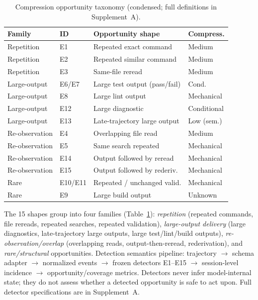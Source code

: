 ﻿\documentclass[sigconf,balance=false]{acmart}
\begin{document}
\begin{table}[t]
\centering
\caption{Compression opportunity taxonomy (condensed; full definitions in Supplement~A).}
\label{tab:taxonomy}
\small
\begin{tabular}{@{}llll@{}}
\toprule
\textbf{Family} & \textbf{ID} & \textbf{Opportunity shape} & \textbf{Compress.} \\
\midrule
Repetition & E1 & Repeated exact command & Medium \\
Repetition & E2 & Repeated similar command & Medium \\
Repetition & E3 & Same-file reread & Medium \\
Large-output & E6/E7 & Large test output (pass/fail) & Cond. \\
Large-output & E8 & Large lint output & Mechanical \\
Large-output & E12 & Large diagnostic & Conditional \\
Large-output & E13 & Late-trajectory large output & Low (sem.) \\
Re-observation & E4 & Overlapping file read & Medium \\
Re-observation & E5 & Same search repeated & Mechanical \\
Re-observation & E14 & Output followed by reread & Mechanical \\
Re-observation & E15 & Output followed by rederiv. & Mechanical \\
Rare & E10/E11 & Repeated / unchanged valid. & Mechanical \\
Rare & E9 & Large build output & Unknown \\
\bottomrule
\end{tabular}
\end{table}

The 15 shapes group into four families (Table~\ref{tab:taxonomy}): \emph{repetition} (repeated commands, file rereads, repeated searches, repeated validation), \emph{large-output delivery} (large diagnostics, late-trajectory large outputs, large test/lint/build outputs), \emph{re-observation/overlap} (overlapping reads, output-then-reread, rederivation), and \emph{rare/structural} opportunities. Detection semantics pipeline: trajectory $\rightarrow$ schema adapter $\rightarrow$ normalized events $\rightarrow$ frozen detectors E1--E15 $\rightarrow$ session-level incidence $\rightarrow$ opportunity/coverage metrics. Detectors never infer model-internal state; they do not assess whether a detected opportunity is safe to act upon. Full detector specifications are in Supplement~A.
\end{document}
